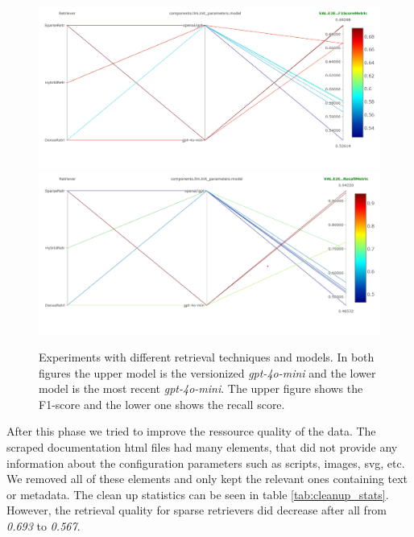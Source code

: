 \begin{figure}[!ht]
    \centering
    \includegraphics[width=\textwidth]{images/RetrievalTypes-vs-LLM-f1.png}\\[6pt]
    \includegraphics[width=\textwidth]{images/RetrievalTypes-vs-LLM-Recall.png}
    \caption{Experiments with different retrieval techniques and models. In both figures the upper model is the versionized \textit{gpt-4o-mini} and the lower model is the most recent \textit{gpt-4o-mini}. The upper figure shows the F1-score and the lower one shows the recall score.}
    \label{fig:conf-phase-0-retrievers}
\end{figure}

After this phase we tried to improve the ressource quality of the data. The scraped documentation html files had many elements, that did not provide any information about the configuration parameters such as scripts, images, svg, etc. We removed all of these elements and only kept the relevant ones containing text or metadata. The clean up statistics can be seen in table \ref{tab:cleanup_stats}. However, the retrieval quality for sparse retrievers did decrease after all from \textit{0.693} to \textit{0.567}. 

